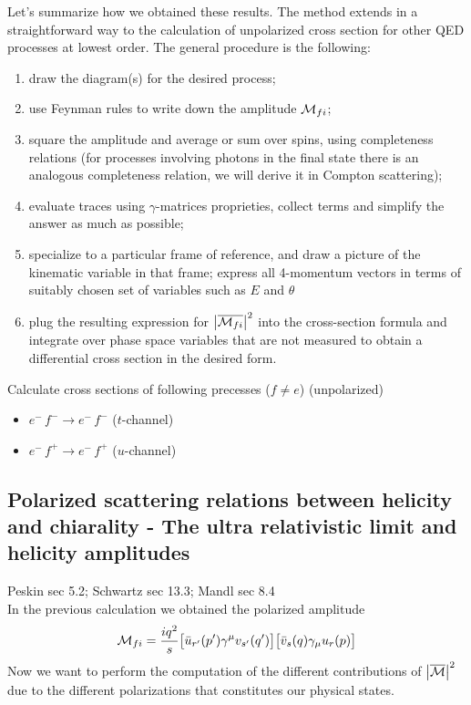\documentclass[TheoreticalPhy_ModB.tex]{subfiles}
\begin{document}
\skipline

Let's summarize how we obtained these results. The method extends in a straightforward way to the calculation of unpolarized cross section for other QED processes at lowest order. The general procedure is the following:
\begin{enumerate}[label=(\arabic*)]
\item draw the diagram(s) for the desired process;
\item use Feynman rules to write down the amplitude $\mathcal{M}_{fi}$;
\item square the amplitude and average or sum over spins, using completeness relations (for processes involving photons in the final state there is an analogous completeness relation, we will derive it in Compton scattering);
\item evaluate traces using $\gamma$-matrices proprieties, collect terms and simplify the answer as much as possible;
\item specialize to a particular frame of reference, and draw a picture of the kinematic variable in that frame; express all 4-momentum vectors in terms of suitably chosen set of variables such as $E$ and $\theta$
\item plug the resulting expression for $\abs{\overline{\mathcal{M}_{fi}}}^2$ into the cross-section formula and integrate over phase space variables that are not measured to obtain a differential cross section in the desired form.
\end{enumerate}

\begin{exercise}
Calculate cross sections of following precesses ($f \ne e$) (unpolarized)
\begin{itemize}[label = $\bullet$]
\item $e^- \, f^- \to e^- \, f^-$ \quad ($t$-channel)
\item $e^- \, f^+ \to e^- \, f^+$ \quad ($u$-channel) 
\end{itemize}
\end{exercise}

\subsection{Polarized scattering relations between helicity and chiarality - The ultra relativistic limit and helicity amplitudes}
\textsf{Peskin sec 5.2; Schwartz sec 13.3; Mandl sec 8.4}\\


In the previous calculation we obtained the polarized amplitude
\[
\mathcal{M}_{fi} = \frac{iq^2}{s} \bigl[ \bar{u}_{r'} (p') \gamma^{\mu} v_{s'} (q') \bigr] \bigl[ \bar{v}_s (q)\gamma_{\mu} u_r(p) \bigr]
\]
Now we want to perform the computation of the different contributions of $\abs{\overline{\mathcal{M}}}^2$ due to the different polarizations that constitutes our physical states. 
\end{document}
